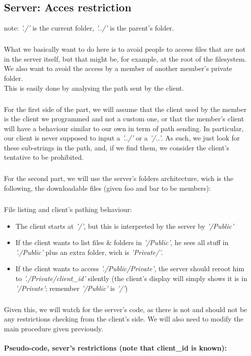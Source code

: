 \documentclass[12pt,a4paper,twoside]{article}
\begin{document}
		\subsection{Server: Acces restriction} %
			note: \textit{'./'} is the current folder, \textit{'../'} is the parent's folder.
			\subparagraph*{}
				What we basically want to do here is to avoid people to access files that are not in the server itself, but that might be, for example, at the root of the filesystem. We also want to avoid the access by a member of another member's private folder.\\
				This is easily done by analysing the path sent by the client.
			\subparagraph*{}
				For the first side of the part, we will assume that the client used by the member is the client we programmed and not a custom one, or that the member's client will have a behaviour similar to our own in term of path sending. In particular, our client is never supposed to input a \textit{'../'} or a \textit{'/..'}. As such, we just look for these sub-strings in the path, and, if we find them, we consider the client's tentative to be prohibited.
			\subparagraph*{}
				For the second part, we will use the server's folders architecture, wich is the following, the downloadable files (given foo and bar to be members):
				\begin{samepage}
					
				\end{samepage}
			\subparagraph*{}
				File listing and client's pathing behaviour:
				\begin{itemize}
					\item{} The client starts at \textit{'/'}, but this is interpreted by the server by \textit{'/Public'}
					\item{} If the client wants to list files \& folders in \textit{'/Public'}, he sees all stuff in \textit{'./Public'} plus an extra folder, wich is \textit{'Private/'}.
					\item{} If the client wants to access \textit{'./Public/Private'}, the server should reroot him to \textit{'./Private/client\_id'} silently (the client's display will simply shows it is in \textit{'/Private'}; remember \textit{'/Public'} is \textit{'/'})
				 \end{itemize}
			\subparagraph*{}
				Given this, we will watch for the server's code, as there is not and should not be any restrictions checking from the client's side. We will also need to modify the main procedure given previously.
			\paragraph*{Pseudo-code, sever's restrictions (note that client\_id is known):}
				
				
\end{document}
